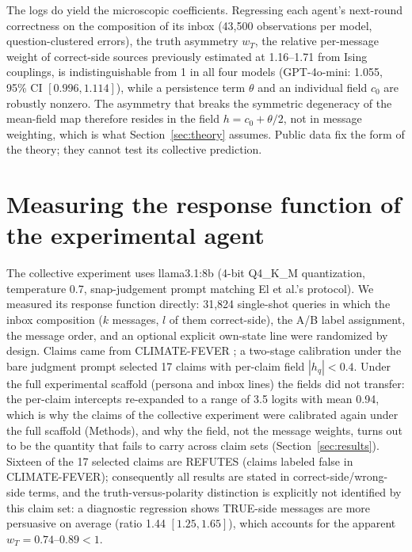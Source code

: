\documentclass[9pt,twocolumn]{extarticle}
\begin{document}
The logs do yield the microscopic coefficients. Regressing each agent's
next-round correctness on the composition of its inbox (43{,}500 observations
per model, question-clustered errors), the truth asymmetry $w_T$, the
relative per-message weight of correct-side sources previously estimated at
1.16--1.71 from Ising couplings, is indistinguishable from 1 in all four
models (GPT-4o-mini: 1.055, 95\% CI $[0.996, 1.114]$), while a persistence
term $\theta$ and an individual field $c_0$ are robustly nonzero. The
asymmetry that breaks the symmetric degeneracy of the mean-field map
therefore resides in the field $h = c_0 + \theta/2$, not in message
weighting, which is what Section~\ref{sec:theory} assumes. Public data fix
the form of the theory; they cannot test its collective prediction.

\section{Measuring the response function of the experimental agent}
\label{sec:measurement}

The collective experiment uses llama3.1:8b (4-bit Q4\_K\_M quantization, temperature 0.7,
snap-judgement prompt matching El et al.'s protocol). We measured its response
function directly: 31{,}824 single-shot queries in which the inbox composition
($k$ messages, $l$ of them correct-side), the A/B label assignment, the
message order, and an optional explicit own-state line were randomized by
design. Claims came from CLIMATE-FEVER \citep{Diggelmann2020}; a two-stage
calibration under the bare judgment prompt selected 17 claims with per-claim
field $|h_q| < 0.4$. Under the full experimental scaffold (persona and inbox
lines) the fields did not transfer: the per-claim intercepts re-expanded to a
range of 3.5 logits with mean 0.94, which is why the claims of the collective
experiment were calibrated again under the full scaffold (Methods), and why
the field, not the message weights, turns out to be the quantity that fails to
carry across claim sets (Section~\ref{sec:results}). Sixteen of the 17 selected claims are REFUTES (claims labeled false in CLIMATE-FEVER); consequently all results are stated in
correct-side/wrong-side terms, and the truth-versus-polarity distinction is
explicitly not identified by this claim set: a diagnostic regression shows
TRUE-side messages are more persuasive on average (ratio 1.44 $[1.25, 1.65]$), which accounts for the apparent $w_T = 0.74$--$0.89 < 1$.
\end{document}
